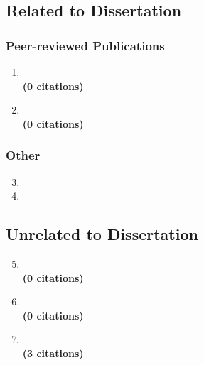 \documentclass[12pt, a4paper]{book}
\begin{document}
\ListOfPublications{}

\subsection*{Related to Dissertation}
\subsubsection*{Peer-reviewed Publications}

\begin{enumerate}
  \item {} \\
  \textbf{(0 citations)}
  \item {} \\
  \textbf{(0 citations)}
\end{enumerate}

\subsubsection*{Other}
\begin{enumerate}
  \setcounter{enumi}{2}
  \item {}
  \item {}
\end{enumerate}

\subsection*{Unrelated to Dissertation}

\begin{enumerate}
  \setcounter{enumi}{4}
  \item {} \\
  \textbf{(0 citations)}
  \clearpage
  \item {} \\
  \textbf{(0 citations)}
  \item {} \\
  \textbf{(3 citations)}
\end{enumerate}
\end{document}
